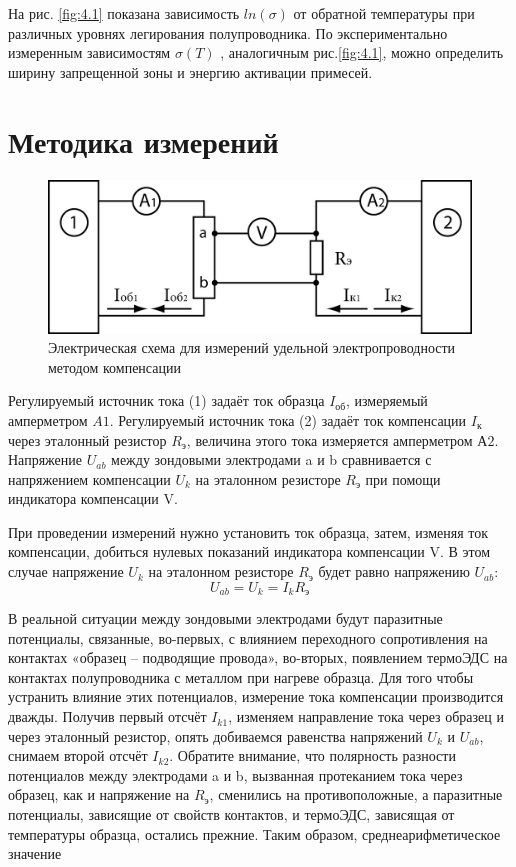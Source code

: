 		На рис. \ref{fig:4.1} показана зависимость $ln(\sigma)$ от обратной температуры при различных уровнях легирования полупроводника. По
		экспериментально измеренным зависимостям $\sigma(T)$ , аналогичным рис.\ref{fig:4.1}, можно определить ширину запрещенной зоны и
		энергию активации примесей. 
		
		\section{Методика измерений}
		
		\begin{figure}[h!]
			\centering
			\includegraphics[width = .9\linewidth]{img/scheme.jpg}
			\caption{Электрическая схема для измерений удельной электропроводности методом компенсации}
			\label{fig:5.1}
		\end{figure}
		
		Регулируемый источник тока (1) задаёт ток образца $I_\text{об}$, измеряемый амперметром $A1$. Регулируемый источник тока
		(2) задаёт ток компенсации $I_\text{к}$ через эталонный резистор $R_\text{э}$, величина этого тока измеряется
		амперметром $А2$. Напряжение $U_{ab}$ между зондовыми электродами a и b сравнивается с напряжением компенсации $U_k$ на
		эталонном резисторе $R_\text{э}$ при помощи индикатора компенсации V.
		
		При проведении измерений нужно установить ток образца, затем, изменяя ток компенсации, добиться нулевых показаний
		индикатора компенсации V. В этом случае напряжение $U_k$ на эталонном резисторе $R_\text{э}$ будет равно напряжению $U_{ab}$:
		\begin{equation}
		U_{ab}=U_{k}=I_{k} R_{\text{э}} 
		\label{eq:5.1}
		\end{equation}
		
		В реальной ситуации между зондовыми электродами будут паразитные потенциалы, связанные, во-первых, с влиянием
		переходного сопротивления на контактах «образец – подводящие провода», во-вторых, появлением термоЭДС на контактах
		полупроводника с металлом при нагреве образца. Для того чтобы устранить влияние этих потенциалов, измерение тока
		компенсации производится дважды. Получив первый отсчёт $I_{k1}$, изменяем направление тока через образец и через
		эталонный резистор, опять добиваемся равенства напряжений $U_k$ и $U_{ab}$, снимаем второй отсчёт $I_{k2}$. Обратите
		внимание, что полярность разности потенциалов между электродами a и b, вызванная протеканием тока через образец, как и
		напряжение на $R_\text{э}$, сменились на противоположные, а паразитные потенциалы, зависящие от свойств контактов, и
		термоЭДС, зависящая от температуры образца, остались прежние. Таким образом, среднеарифметическое значение 
		
